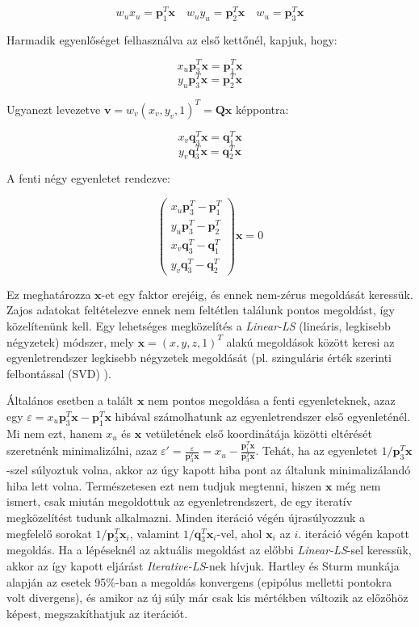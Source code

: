 \[w_ux_u = \mathbf{p}_1^T\mathbf{x} \quad w_uy_u = \mathbf{p}_2^T\mathbf{x} \quad w_u = \mathbf{p}_3^T\mathbf{x}\]

Harmadik egyenlőséget felhasználva az első kettőnél, kapjuk, hogy:

\[x_u\mathbf{p}_3^T\mathbf{x} = \mathbf{p}_1^T\mathbf{x}\]
\[y_u\mathbf{p}_3^T\mathbf{x} = \mathbf{p}_2^T\mathbf{x}\]

Ugyanezt levezetve $\mathbf{v} = w_v(x_v, y_v, 1)^T = \mathbf{Q}\mathbf{x}$ képpontra:

\[x_v\mathbf{q}_3^T\mathbf{x} = \mathbf{q}_1^T\mathbf{x}\]
\[y_v\mathbf{q}_3^T\mathbf{x} = \mathbf{q}_2^T\mathbf{x}\]

A fenti négy egyenletet rendezve:

\[\left( \begin{array}{c} x_u\mathbf{p}_3^T - \mathbf{p}_1^T \\ y_u\mathbf{p}_3^T - \mathbf{p}_2^T \\ x_v\mathbf{q}_3^T - \mathbf{q}_1^T \\ y_v\mathbf{q}_3^T - \mathbf{q}_2^T \end{array} \right) \mathbf{x} = 0\]

Ez meghatározza $\mathbf{x}$-et egy faktor erejéig, és ennek nem-zérus megoldását keressük. Zajos adatokat feltételezve ennek nem feltétlen találunk pontos megoldást, így közelítenünk kell. Egy lehetséges megközelítés a \textit{Linear-LS} (lineáris, legkisebb négyzetek) módszer, mely $\mathbf{x} = (x, y, z, 1)^T$ alakú megoldások között keresi az egyenletrendszer legkisebb négyzetek megoldását (pl. szinguláris érték szerinti felbontással (SVD) \cite{cs-svd}). 

Általános esetben a talált $\mathbf{x}$ nem pontos megoldása a fenti egyenleteknek, azaz egy $\varepsilon = x_u\mathbf{p}_3^T\mathbf{x} - \mathbf{p}_1^T\mathbf{x}$ hibával számolhatunk az egyenletrendszer első egyenleténél. Mi nem ezt, hanem $x_u$ és $\mathbf{x}$ vetületének első koordinátája közötti eltérését szeretnénk minimalizálni, azaz $\varepsilon' = \frac{\varepsilon}{\mathbf{p}_3^T\mathbf{x}} = x_u - \frac{\mathbf{p}_1^T\mathbf{x}}{\mathbf{p}_3^T\mathbf{x}}$. Tehát, ha az egyenletet $1 / \mathbf{p}_3^T\mathbf{x}$-szel súlyoztuk volna, akkor az úgy kapott hiba pont az általunk minimalizálandó hiba lett volna. Természetesen ezt nem tudjuk megtenni, hiszen $\mathbf{x}$ még nem ismert, csak miután megoldottuk az egyenletrendszert, de egy iteratív megközelítést tudunk alkalmazni. Minden iteráció végén újrasúlyozzuk a megfelelő sorokat $1 / \mathbf{p}_3^T\mathbf{x}_i$, valamint $1 / \mathbf{q}_3^T\mathbf{x}_i$-vel, ahol $\mathbf{x}_i$ az $i$. iteráció végén kapott megoldás. Ha a lépéseknél az aktuális megoldást az előbbi \textit{Linear-LS}-sel keressük, akkor az így kapott eljárást \textit{Iterative-LS}-nek hívjuk. Hartley és Sturm \cite[5.2 szekció]{hartley-triangulation} munkája alapján az esetek 95\%-ban a megoldás konvergens (epipólus melletti pontokra volt divergens), és amikor az új súly már csak kis mértékben változik az előzőhöz képest, megszakíthatjuk az iterációt.

